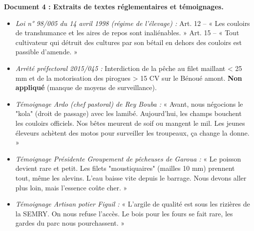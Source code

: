 \documentclass[11pt]{article}
\begin{document}
\textbf{Document 4 : Extraits de textes réglementaires et témoignages.}
\begin{itemize}
    \item \textit{Loi n° 98/005 du 14 avril 1998 (régime de l'élevage) :} Art. 12 -- « Les couloirs de transhumance et les aires de repos sont inaliénables. » Art. 15 -- « Tout cultivateur qui détruit des cultures par son bétail en dehors des couloirs est passible d'amende. »
    \item \textit{Arrêté préfectoral 2015/045 :} Interdiction de la pêche au filet maillant < 25 mm et de la motorisation des pirogues > 15 CV sur le Bénoué amont. \textbf{Non appliqué} (manque de moyens de surveillance).
    \item \textit{Témoignage Ardo (chef pastoral) de Rey Bouba :} « Avant, nous négocions le "kola" (droit de passage) avec les lamibé. Aujourd'hui, les champs bouchent les couloirs officiels. Nos bêtes meurent de soif ou mangent le mil. Les jeunes éleveurs achètent des motos pour surveiller les troupeaux, ça change la donne. »
    \item \textit{Témoignage Présidente Groupement de pêcheuses de Garoua :} « Le poisson devient rare et petit. Les filets "moustiquaires" (mailles 10 mm) prennent tout, même les alevins. L'eau baisse vite depuis le barrage. Nous devons aller plus loin, mais l'essence coûte cher. »
    \item \textit{Témoignage Artisan potier Figuil :} « L'argile de qualité est sous les rizières de la SEMRY. On nous refuse l'accès. Le bois pour les fours se fait rare, les gardes du parc nous pourchassent. »
\end{itemize}
\end{document}
